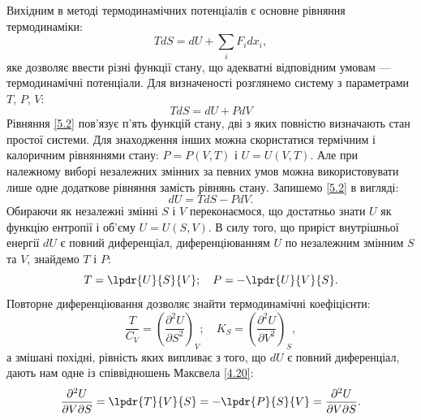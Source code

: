 Вихідним в методі термодинамічних потенціалів є основне рівняння термодинаміки:
\begin{equation}\label{5.1}
	TdS = dU+\sum_{i}F_idx_i,
\end{equation}
яке дозволяє ввести різні функції стану, що адекватні відповідним умовам --- термодинамічні
потенціали. Для визначеності розглянемо систему з параметрами $T$, $P$, $V$:
\begin{equation}\label{5.2}
	TdS = dU+PdV
\end{equation}
Рівняння \eqref{5.2} пов'язує п'ять функцій стану, дві з яких повністю визначають стан простої системи. Для знаходження інших можна скористатися термічним і калоричним рівняннями стану: $P=P(V,T)$ і $U=U(V,T)$. Але при належному виборі незалежних змінних за певних умов можна використовувати лише одне додаткове рівняння замість рівнянь стану. Запишемо \eqref{5.2} в вигляді:
\begin{equation}\label{5.3}
	dU=TdS-PdV.
\end{equation}
Обираючи як незалежні змінні $S$ і $V$ переконаємося, що достатньо знати $U$ як функцію ентропії і об'єму $U=U(S,V)$. В силу того, що приріст внутрішньої енергії $dU$ є повний диференціал, диференціюванням $U$ по незалежним змінним $S$ та $V$, знайдемо $T$ і $P$:
\begin{equation}\label{5.4}
	T=\lpdr{U}{S}{V}; \quad P=-\lpdr{U}{V}{S}.
\end{equation}
Повторне диференціювання дозволяє знайти термодинамічні коефіцієнти:
\begin{equation}\label{5.5}
	\dfrac{T}{C_V}=\left(\dfrac{\partial^2U}{\partial S^2}\right)_{V}; \quad
	K_{S}=\left(\dfrac{\partial^2U}{\partial V^2}\right)_{S},
\end{equation}
а змішані похідні, рівність яких випливає з того, що $dU$ є повний диференціал, дають нам одне із
співвідношень Максвела \eqref{4.20}:
\begin{equation}\label{5.6}
	\dfrac{\partial^2U}{\partial V\partial S} = \lpdr{T}{V}{S} = -
	\lpdr{P}{S}{V}=\dfrac{\partial^2U}{\partial V\partial S}.
\end{equation}
